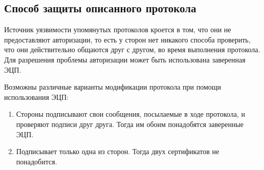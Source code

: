 \subsection{Способ защиты описанного протокола}
Источник уязвимости упомянутых протоколов кроется в том, что они не предоставляют авторизации, то есть у сторон нет никакого способа проверить, что они действительно общаются друг с другом, во время выполнения протокола. Для разрешения проблемы авторизации может быть использована заверенная ЭЦП.

Возможны различные варианты модификации протокола при помощи использования ЭЦП:
\begin{enumerate}
	\item Стороны  подписывают свои сообщения, посылаемые в ходе протокола, и проверяют подписи друг друга. Тогда им обоим понадобятся заверенные ЭЦП. 
	\item Подписывает только одна из сторон. Тогда двух сертификатов не понадобится.
\end{enumerate} 

